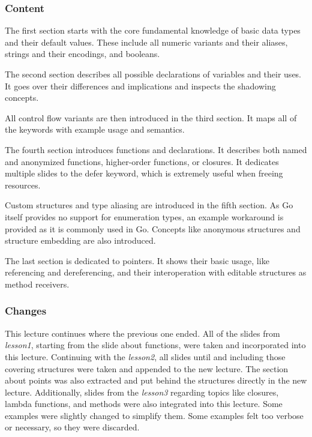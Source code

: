 \documentclass[
  digital,
  color,
  oneside,
  nosansbold,
  nocolorbold,
  nolof,
  nolot,
]{fithesis4}
\begin{document}
\subsubsection{Content}

The first section starts with the core fundamental knowledge of basic data types and their default values. These include all numeric variants and their aliases, strings and their encodings, and booleans.

The second section describes all possible declarations of variables and their uses. It goes over their differences and implications and inspects the shadowing concepts.

All control flow variants are then introduced in the third section. It maps all of the keywords with example usage and semantics.

The fourth section introduces functions and declarations. It describes both named and anonymized functions, higher-order functions, or closures. It dedicates multiple slides to the defer keyword, which is extremely useful when freeing resources.

Custom structures and type aliasing are introduced in the fifth section. As Go itself provides no support for enumeration types, an example workaround is provided as it is commonly used in Go. Concepts like anonymous structures and structure embedding are also introduced.

The last section is dedicated to pointers. It shows their basic usage, like referencing and dereferencing, and their interoperation with editable structures as method receivers.

\subsubsection{Changes}

This lecture continues where the previous one ended. All of the slides from \textit{lesson1}, starting from the slide about functions, were taken and incorporated into this lecture. Continuing with the \textit{lesson2}, all slides until and including those covering structures were taken and appended to the new lecture. The section about points was also extracted and put behind the structures directly in the new lecture. Additionally, slides from the \textit{lesson3} regarding topics like closures, lambda functions, and methods were also integrated into this lecture. Some examples were slightly changed to simplify them. Some examples felt too verbose or necessary, so they were discarded.
\end{document}
